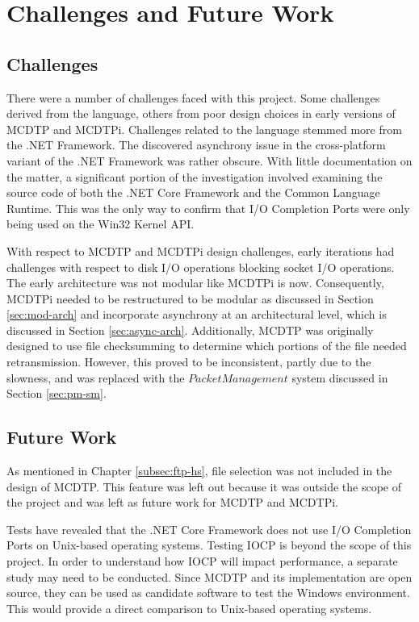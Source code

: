\chapter{Challenges and Future Work}\label{chp:c-fw}

\section{Challenges}

There were a number of challenges faced with this project. Some challenges derived from the language, others from poor design choices in early versions of MCDTP and MCDTPi. Challenges related to the language stemmed more from the .NET Framework. The discovered asynchrony issue in the cross-platform variant of the .NET Framework was rather obscure. With little documentation on the matter, a significant portion of the investigation involved examining the source code of both the .NET Core Framework and the Common Language Runtime. This was the only way to confirm that I/O Completion Ports were only being used on the Win32 Kernel API.

With respect to MCDTP and MCDTPi design challenges, early iterations had challenges with respect to disk I/O operations blocking socket I/O operations. The early architecture was not modular like MCDTPi is now. Consequently, MCDTPi needed to be restructured to be modular as discussed in Section \ref{sec:mod-arch} and incorporate asynchrony at an architectural level, which is discussed in Section \ref{sec:async-arch}. Additionally, MCDTP was originally designed to use file checksumming to determine which portions of the file needed retransmission. However, this proved to be inconsistent, partly due to the slowness, and was replaced with the $PacketManagement$ system discussed in Section \ref{sec:pm-sm}.

\section{Future Work}

As mentioned in Chapter \ref{subsec:ftp-hs}, file selection was not included in the design of MCDTP. This feature was left out because it was outside the scope of the project and was left as future work for MCDTP and MCDTPi.

Tests have revealed that the .NET Core Framework does not use I/O Completion Ports on Unix-based operating systems. Testing IOCP is beyond the scope of this project. In order to understand how IOCP will impact performance, a separate study may need to be conducted. Since MCDTP and its implementation are open source, they can be used as candidate software to test the Windows environment. This would provide a direct comparison to Unix-based operating systems.

